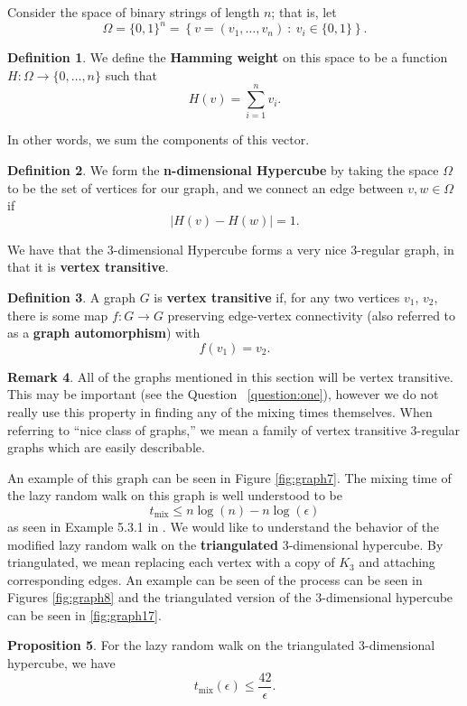 \documentclass[10pt,a4paper]{amsart}
\theoremstyle{definition}
\newtheorem{definition}{Definition}
\numberwithin{definition}{section}
\newtheorem{remark}[definition]{Remark}
\newtheorem{proposition}[definition]{Proposition}
\begin{document}
Consider the space of binary strings of length $n$; that is, let 
\[\Omega = \{0,1\}^n = \left\{v = (v_1, \ldots, v_n) \ : \ v_i \in \{0,1\}\right\}.\] 
\begin{definition}
We define the \textbf{Hamming weight} on this space to be a function $H : \Omega \rightarrow \{0, \ldots, n\}$ such that 
\[ H(v) = \sum_{i=1}^n v_i.\]
\end{definition}
In other words, we sum the components of this vector. 
\begin{definition}
We form the \textbf{n-dimensional Hypercube} by taking the space $\Omega$ to be the set of vertices for our graph, and we connect an edge between $v, w \in \Omega$ if 
\[|H(v) - H(w)| = 1.\]
\end{definition}
We have that the $3$-dimensional Hypercube forms a very nice $3$-regular graph, in that it is \textbf{vertex transitive}.

\begin{definition}
A graph $G$ is \textbf{vertex transitive} if, for any two vertices $v_1$, $v_2$, there is some map $f: G \rightarrow G$ preserving edge-vertex connectivity (also referred to as a \textbf{graph automorphism}) with
\[f(v_1) = v_2. \]
\end{definition}

\begin{remark}
All of the graphs mentioned in this section will be vertex transitive. This may be important (see the Question ~\ref{question:one}), however we do not really use this property in finding any of the mixing times themselves. When referring to ``nice class of graphs,'' we mean a family of vertex transitive $3$-regular graphs which are easily describable.
\end{remark}

An example of this graph can be seen in Figure \ref{fig:graph7}. The mixing time of the lazy random walk on this graph is well understood to be 
\[ t_{\text{mix}} \leq n \log(n) - n \log(\epsilon)\]
as seen in Example 5.3.1 in \cite{LevinPeresWilmer2006}. 
We would like to understand the behavior of the modified lazy random walk on the \textbf{triangulated} $3$-dimensional hypercube. By triangulated, we mean replacing each vertex with a copy of $K_3$ and attaching corresponding edges. An example can be seen of the process can be seen in Figures \ref{fig:graph8} and the triangulated version of the $3$-dimensional hypercube can be seen in \ref{fig:graph17}. 

\begin{proposition}
For the lazy random walk on the triangulated $3$-dimensional hypercube, we have 
\[ t_{\text{mix}}(\epsilon) \leq \frac{42}{\epsilon}.\]
\end{proposition}
\end{document}
